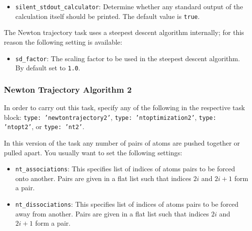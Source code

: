 \documentclass[]{tufte-book}
\begin{document}
\begin{itemize}
\item \texttt{silent\_stdout\_calculator}: Determine whether any standard output of the calculation itself should be printed. The default value is \texttt{true}.
\end{itemize}

The Newton trajectory task uses a steepest descent algorithm internally; for this reason the following setting is available:
\begin{itemize}
\item \texttt{sd\_factor}: The scaling factor to be used in the steepest descent algorithm. By default set to \texttt{1.0}.
\end{itemize}

\subsubsection{Newton Trajectory Algorithm 2}
In order to carry out this task, specify any of the following in the respective task block:
\texttt{type: 'newtontrajectory2'}, \texttt{type: 'ntoptimization2'}, \texttt{type: 'ntopt2'}, or \texttt{type: 'nt2'}.

In this version of the task any number of pairs of atoms are pushed together or pulled apart.
You usually want to set the following settings:
\begin{itemize}
\item \texttt{nt\_associations}: This specifies list of indices of atoms pairs to be forced onto another.
 Pairs are given in a flat list such that indices $2i$ and $2i+1$ form a pair.
\item \texttt{nt\_dissociations}: This specifies list of indices of atoms pairs to be forced away from another.
 Pairs are given in a flat list such that indices $2i$ and $2i+1$ form a pair.
\end{itemize}
\end{document}

